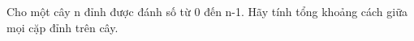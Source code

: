 Cho một cây n đỉnh được đánh số từ 0 đến n-1. Hãy tính tổng khoảng cách giữa mọi cặp đỉnh trên cây.  

\